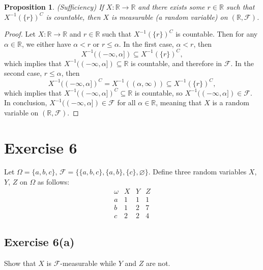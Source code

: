 \documentclass[12pt]{article}
\newtheorem{proposition}{Proposition}
\newenvironment{problem}
    {\begin{lrbox}{\mybox}\begin{minipage}{\textwidth-10pt}}
    {\end{minipage}\end{lrbox}\framebox[\textwidth]{\usebox{\mybox}}}
\newcommand{\R}{\mathbb{R}}
\let\emptyset\varnothing
\newcommand{\FF}{\mathcal{F}}
\begin{document}
\begin{proposition}
    (Sufficiency) If $X:\R\to\R$ and there exists some $r\in\R$ such that $X^{-1}(\{r\})^C$ is countable, then $X$ is measurable (a random variable) on $(\R,\FF)$.
\end{proposition}

\begin{proof}
    Let $X:\R\to\R$ and $r\in\R$ such that $X^{-1}(\{r\})^C$ is countable. Then for any $\alpha\in\R$, we either have $\alpha< r$ or $r\leq \alpha$. In the first case, $\alpha< r$, then
    \[X^{-1}((-\infty,\alpha]) \subseteq X^{-1}(\{r\})^C,\]
    which implies that $X^{-1}((-\infty,\alpha])\subseteq\R$ is countable, and therefore in $\FF$. In the second case, $r\leq \alpha$, then
    \[X^{-1}((-\infty,\alpha])^C = X^{-1}((\alpha,\infty))\subseteq X^{-1}(\{r\})^C,\]
     which implies that $X^{-1}((-\infty,\alpha])^C\subseteq\R$ is countable, so $X^{-1}((-\infty,\alpha])\in\FF$. In conclusion, $X^{-1}((-\infty,\alpha])\in\FF$ for all $\alpha\in\R$, meaning that $X$ is a random variable on $(\R,\FF)$.
    
\end{proof}


\newpage
\section*{Exercise 6}
\begin{problem}
    Let $\Omega = \{a,b,c\}$, $\FF=\{\{a,b,c\}, \{a,b\}, \{c\}, \emptyset\}$. Define three random variables $X$, $Y$, $Z$ on $\Omega$ as follows:
    \[\begin{array}{c|ccc}
        \omega & X & Y & Z \\
        \hline
        a & 1 & 1 & 1 \\
        b & 1 & 2 & 7 \\
        c & 2 & 2 & 4
    \end{array}\]
\end{problem}

\subsection*{Exercise 6(a)}
\begin{problem}
    Show that $X$ is $\FF$-measurable while $Y$ and $Z$ are not.
\end{problem}
\end{document}
